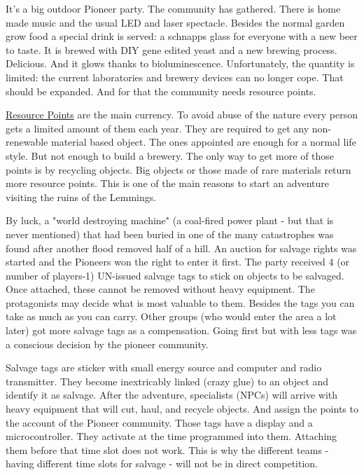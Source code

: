 It's a big outdoor Pioneer party. The community has gathered. There is home made music and the usual LED and laser spectacle. Besides the normal garden grow food a special drink is served: a schnapps glass for everyone with a new beer to taste.
It is brewed with DIY gene edited yeast and a new brewing process. Delicious. And it glows thanks to bioluminescence. Unfortunately, the quantity is limited: the current laboratories and brewery devices can no longer cope. That should be expanded. And for that the community needs resource points.

\begin{sidebarBox}[title=Resource points]
\hyperref[sec:Resource Points]{Resource Points} are the main currency. To avoid abuse of the nature every person gets a limited amount of them each year. They are required to get any non-renewable  material based object. The ones appointed are enough for a normal life style. But not enough to build a brewery. The only way to get more of those points is by recycling objects. Big objects or those made of rare materials return more resource points. This is one of the main reasons to start an adventure visiting the ruins of the Lemmings.
\end{sidebarBox}

By luck, a "world destroying machine" (a coal-fired power plant - but that is never mentioned) that had been buried in one of the many catastrophes was found after another flood removed half of a hill. An auction for salvage rights was started and the Pioneers won the right to enter it first.
The party received 4 (or number of players-1) UN-issued salvage tags to stick on objects to be salvaged. Once attached, these cannot be removed without heavy equipment. The protagonists may decide what is most valuable to them. Besides the tags you can take as much as you can carry.
Other groups (who would enter the area a lot later) got more salvage tags as a compensation. Going first but with less tags was a conscious decision by the pioneer community.

\begin{sidebarBox}[title=Salvage tags]
Salvage tags are sticker with small energy source and computer and radio transmitter. They become inextricably linked (crazy glue) to an object and identify it as salvage. After the adventure, specialists (NPCs) will arrive with heavy equipment that will cut, haul, and recycle objects. And assign the points to the account of the Pioneer community.
Those tags have a display and a microcontroller. They activate at the time programmed into them. Attaching them before that time slot does not work. This is why the different teams - having different time slots for salvage - will not be in direct competition.
\end{sidebarBox}


